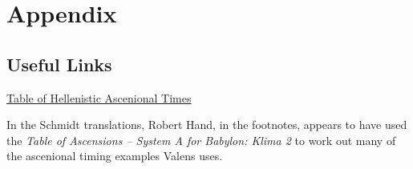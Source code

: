 \chapter{Appendix}

\section{Useful Links}
\noindent\href{http://www.projecthindsight.com/images/TablesPDFs/Tb2-AscT-sysAB.pdf}{Table of Hellenistic Ascenional Times}
	
	In the Schmidt translations, Robert Hand, in the footnotes, appears to have used the \textsl{Table of Ascensions – System A for Babylon: Klima 2} to work out many of the ascenional timing examples Valens uses.